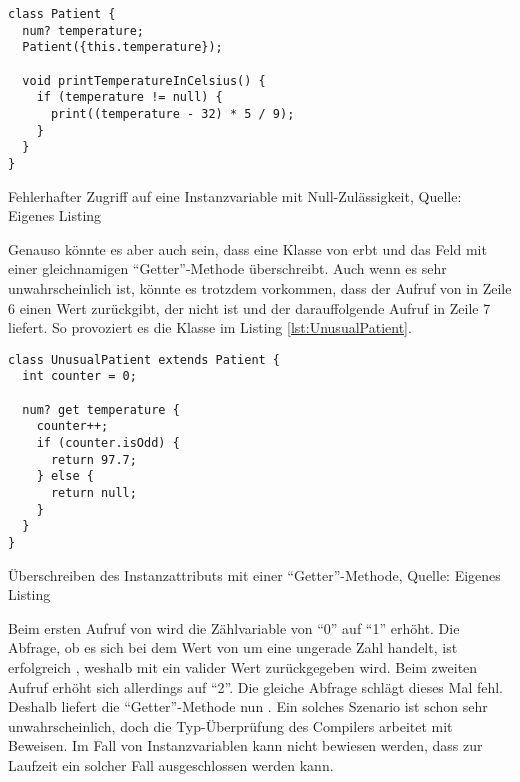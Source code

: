 \ifIncludeFigures
  \begin{listing}[ht]
    \begin{verbatim}
class Patient {
  num? temperature;
  Patient({this.temperature});

  void printTemperatureInCelsius() {
    if (temperature != null) {
      print((temperature - 32) * 5 / 9);
    }
  }
}
    \end{verbatim}
    \caption[Fehlerhafter Zugriff auf eine Instanzvariable mit Null-Zulässigkeit]{Fehlerhafter Zugriff auf eine Instanzvariable mit Null-Zulässigkeit, Quelle: Eigenes Listing}
    \label{lst:PatientWithoutNullCheck}
  \end{listing}
\fi

Genauso könnte es aber auch sein, dass eine Klasse von  erbt und das Feld  mit einer gleichnamigen \enquote{Getter}-Methode überschreibt.
Auch wenn es sehr unwahrscheinlich ist, könnte es trotzdem vorkommen, dass der Aufruf von  in Zeile 6 einen Wert zurückgibt, der nicht  ist und der darauffolgende Aufruf in Zeile 7  liefert.
So provoziert es die Klasse  im Listing \ref{lst:UnusualPatient}.
\ifIncludeFigures
  \begin{listing}[ht]
    \begin{verbatim}
class UnusualPatient extends Patient {
  int counter = 0;

  num? get temperature {
    counter++;
    if (counter.isOdd) {
      return 97.7;
    } else {
      return null;
    }
  }
}
\end{verbatim}
    \caption[Überschreiben des Instanzattributs mit einer \enquote{Getter}-Methode]{Überschreiben des Instanzattributs mit einer \enquote{Getter}-Methode, Quelle: Eigenes Listing}
    \label{lst:UnusualPatient}
  \end{listing}
\fi

Beim ersten Aufruf von  wird die Zählvariable  von \enquote{0} auf \enquote{1} erhöht.
Die Abfrage, ob es sich bei dem Wert von  um eine ungerade Zahl handelt, ist erfolgreich , weshalb mit  ein valider Wert zurückgegeben wird.
Beim zweiten Aufruf erhöht sich  allerdings auf \enquote{2}.
Die gleiche Abfrage schlägt dieses Mal fehl.
Deshalb liefert die \enquote{Getter}-Methode nun  .
Ein solches Szenario ist schon sehr unwahrscheinlich, doch die Typ-Überprüfung des Compilers arbeitet mit Beweisen.
Im Fall von Instanzvariablen kann nicht bewiesen werden, dass zur Laufzeit ein solcher Fall ausgeschlossen werden kann.








